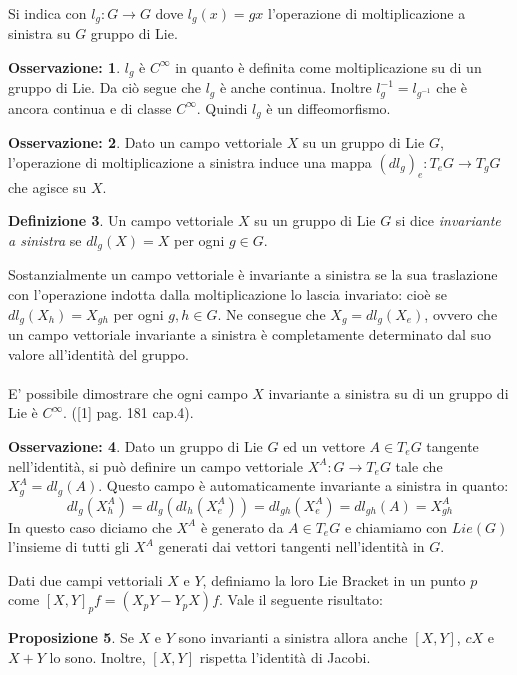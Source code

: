 \documentclass[12pt,a4paper]{report}
\theoremstyle{definition}
\newtheorem{Def}{Definizione}[chapter]
\newtheorem{Prop}[Def]{Proposizione}
\theoremstyle{definition}
\theoremstyle{definition}
\theoremstyle{definition}
\newtheorem{Obs}[Def]{Osservazione:}
\begin{document}
\\
Si indica con $l_g:G\rightarrow G$ dove $l_g(x)=gx$ l'operazione di moltiplicazione a sinistra su $G$ gruppo di Lie.\\
\begin{Obs}
	$l_g$ è $C^\infty$ in quanto è definita come moltiplicazione su di un gruppo di Lie. Da ciò segue che $l_g$ è anche continua. Inoltre $l_g^{-1}=l_{g^{-1}}$ che è ancora continua e di classe $C^\infty$. Quindi $l_g$ è un diffeomorfismo.
\end{Obs}
\begin{Obs}
	Dato un campo vettoriale $X$ su un gruppo di Lie $G$, l'operazione di moltiplicazione a sinistra induce una mappa $(dl_g)_e:T_eG\rightarrow T_gG$ che agisce su $X$.
\end{Obs}

\begin{Def}
	Un campo vettoriale $X$ su un gruppo di Lie $G$ si dice \textit{invariante a sinistra} se $dl_g(X)=X$ per ogni $g\in G$.
\end{Def}
Sostanzialmente un campo vettoriale è invariante a sinistra se la sua traslazione con l'operazione indotta dalla moltiplicazione lo lascia invariato: cioè se $dl_g(X_h)=X_{gh}$ per ogni $g,h\in G$.
Ne consegue che $X_g=dl_g(X_e)$, ovvero che un campo vettoriale invariante a sinistra è completamente determinato dal suo valore all'identità del gruppo.\\
\\
E' possibile dimostrare che ogni campo $X$ invariante a sinistra su di un gruppo di Lie è $C^\infty$. ([1] pag. 181 cap.4).
\begin{Obs}
	Dato un gruppo di Lie $G$ ed un vettore $A\in T_eG$ tangente nell'identità, si può definire un campo vettoriale $X^A:G\rightarrow T_eG$ tale che $X^A_g=dl_g(A)$. Questo campo è automaticamente invariante a sinistra in quanto: $$dl_g(X^A_h)=dl_g(dl_h(X^A_e))=dl_{gh}(X^A_e)=dl_{gh}(A)=X^A_{gh}$$
	In questo caso diciamo che $X^A$ è generato da $A\in T_eG$ e chiamiamo con $Lie(G)$ l'insieme di tutti gli $X^A$ generati dai vettori tangenti nell'identità in $G$.	
\end{Obs}
Dati due campi vettoriali $X$ e $Y$, definiamo la loro Lie Bracket in un punto $p$ come $[X,Y]_pf=(X_pY-Y_pX)f$.
Vale il seguente risultato:
\begin{Prop}
	Se $X$ e $Y$ sono invarianti a sinistra allora anche $[X,Y]$, $cX$ e $X+Y$ lo sono. Inoltre, $[X,Y]$ rispetta l'identità di Jacobi.
\end{Prop}
\end{document}
